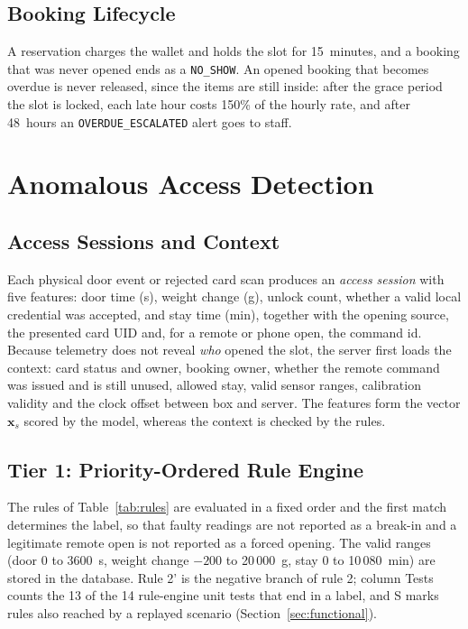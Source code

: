\documentclass[sigconf,screen]{acmart}
\begin{document}
\subsection{Booking Lifecycle}

A reservation charges the wallet and holds the slot for 15~minutes, and a booking that was never opened ends as a
\texttt{NO\_SHOW}. An opened booking that becomes overdue is never released, since the items are still inside: after
the grace period the slot is locked, each late hour costs 150\% of the hourly rate, and after 48~hours an
\texttt{OVERDUE\_ESCALATED} alert goes to staff.

\section{Anomalous Access Detection}\label{sec:detector}

\subsection{Access Sessions and Context}\label{sec:sessions}

Each physical door event or rejected card scan produces an \emph{access session} with five features: door time (s),
weight change (g), unlock count, whether a valid local credential was accepted, and stay time (min), together with the
opening source, the presented card UID and, for a remote or phone open, the command id. Because telemetry does not
reveal \emph{who} opened the slot, the server first loads the context: card status and owner, booking owner, whether the
remote command was issued and is still unused, allowed stay, valid sensor ranges, calibration validity and the clock
offset between box and server. The features form the vector $\mathbf{x}_s$ scored by the model, whereas the context is
checked by the rules.

\subsection{Tier 1: Priority-Ordered Rule Engine}

The rules of Table~\ref{tab:rules} are evaluated in a fixed order and the first match determines the label, so that
faulty readings are not reported as a break-in and a legitimate remote open is not reported as a forced opening. The
valid ranges (door 0 to 3600~s, weight change $-200$ to 20\,000~g, stay 0 to 10\,080~min) are stored in the database. Rule 2'
is the negative branch of rule 2; column Tests counts the 13 of the 14 rule-engine unit tests that end in a label, and
S marks rules also reached by a replayed scenario (Section~\ref{sec:functional}).
\end{document}
